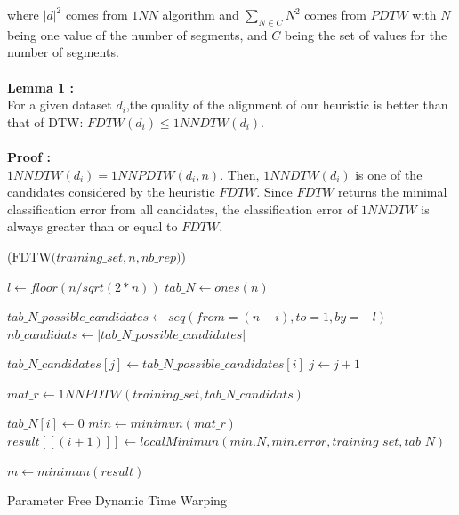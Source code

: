 where $|d|^{2}$ comes from $1NN$ algorithm and
$\underset{N\in C}{\sum}{\displaystyle N^{2}}$ comes from $PDTW$ with $N$ being one value of the
number of segments, and  $C$ being the set of values for the number of segments. 



\paragraph{}\textbf{Lemma 1 : } \\
For a given dataset $d_i$,the quality of the alignment of our heuristic
is better than that of DTW: $ FDTW(d_{i}) \leq 1NNDTW(d_{i}) $.


\paragraph{}\textbf{Proof : } \\
 $1NNDTW(d_i) = 1NNPDTW(d_i,n)$. Then, $1NNDTW(d_i)$ is one of the
candidates considered by the heuristic $FDTW$. Since $FDTW$ returns the
minimal classification error from all candidates, the classification error of
$1NNDTW$ is always greater than or equal to $FDTW$.



\begin{algorithm}[h]
\DontPrintSemicolon
{}

\Begin($\text{FDTW} {(} training\_set, n, nb\_rep {)}$)
{
  $l \leftarrow floor(n/sqrt(2 * n))$\;
  $tab\_N \leftarrow ones(n)$\;
  {
    $tab\_N\_possible\_candidates \leftarrow seq(from = (n - i), to = 1, by = -l)$\;
    $nb\_candidats \leftarrow |tab\_N\_possible\_candidates|$\;

    {
      {
       $tab\_N\_candidates[j] \leftarrow tab\_N\_possible\_candidates[i] $\;
       $j \leftarrow j + 1$
      }

    }
    $mat\_r \leftarrow 1NNPDTW(training\_set, tab\_N\_candidats)$ \;


    {
        $tab\_N[i] \leftarrow 0 $
    }
    $min \leftarrow minimun(mat\_r) $\;
    $result[[(i + 1)]]   \leftarrow localMinimun(min.N,  min.error, training\_set,
    tab\_N)$\;
      
  }
  $m \leftarrow minimun(result)$\;
    

}
\caption{Parameter Free Dynamic Time Warping}\label{algo5}
\end{algorithm}

